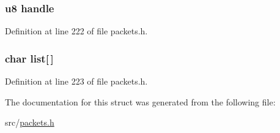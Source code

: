 \subsubsection[{handle}]{ {\bf u8} handle}\label{struct_c_o_n_t_i_n_u_e___l_i_s_t___f_i_l_e_s___r_e_p_l_y_a2f1e90eb35c05582c8b60d001920036a}


Definition at line 222 of file packets.\+h.

\hypertarget{struct_c_o_n_t_i_n_u_e___l_i_s_t___f_i_l_e_s___r_e_p_l_y_aff445b895fa0846e460f0c83e186647d}{}
\subsubsection[{list}]{\setlength{\rightskip}{0pt plus 5cm}char list\mbox{[}$\,$\mbox{]}}\label{struct_c_o_n_t_i_n_u_e___l_i_s_t___f_i_l_e_s___r_e_p_l_y_aff445b895fa0846e460f0c83e186647d}


Definition at line 223 of file packets.\+h.



The documentation for this struct was generated from the following file\+:\begin{DoxyCompactItemize}
\item 
src/\hyperlink{packets_8h}{packets.\+h}\end{DoxyCompactItemize}

